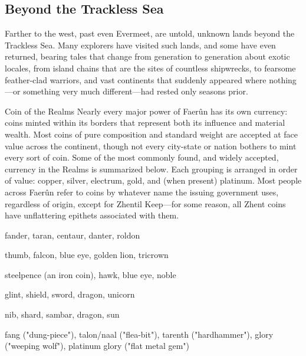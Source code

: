 \documentclass[10pt,a4paper,twoside,twocolumn,openany,bg=print,nodeprecatedcode]{dndbook}
\begin{document}
\subsection{Beyond the Trackless Sea}
Farther to the west, past even Evermeet, are untold, unknown lands beyond the Trackless Sea. Many explorers have visited such lands, and some have even returned, bearing tales that change from generation to generation about exotic locales, from island chains that are the sites of countless shipwrecks, to fearsome feather-clad warriors, and vast continents that suddenly appeared where nothing—or something very much different—had rested only seasons prior.
\begin{DndComment}{Coin of the Realms}
Nearly every major power of Faerûn has its own currency: coins minted within its borders that represent both its influence and material wealth. Most coins of pure composition and standard weight are accepted at face value across the continent, though not every city-state or nation bothers to mint every sort of coin.
Some of the most commonly found, and widely accepted, currency in the Realms is summarized below. Each grouping is arranged in order of value: copper, silver, electrum, gold, and (when present) platinum. Most people across Faerûn refer to coins by whatever name the issuing government uses, regardless of origin, except for Zhentil Keep—for some reason, all Zhent coins have unflattering epithets associated with them.

\begin{description}[nolistsep]
\item[Amn]
fander, taran, centaur, danter, roldon
\item[Cormyr]
thumb, falcon, blue eye, golden lion, tricrown
\item[Sembia]
steelpence (an iron coin), hawk, blue eye, noble
\item[Silverymoon]
glint, shield, sword, dragon, unicorn
\item[Waterdeep]
nib, shard, sambar, dragon, sun
\item[Zhentil Keep]
fang ("dung-piece"), talon/naal ("flea-bit"), tarenth ("hardhammer"), glory ("weeping wolf"), platinum glory ("flat metal gem")
\end{description}


\end{DndComment}
\end{document}
